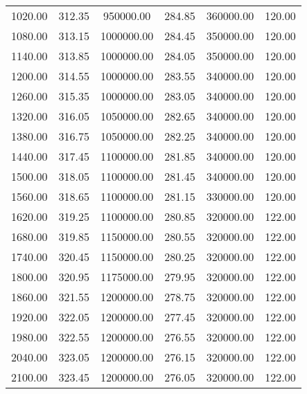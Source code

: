 \begin{table}
\begin{tabular}{S S S S S S}
      1020.00  &      312.35  &   950000.00  &      284.85  &   360000.00  &      120.00\\
      1080.00  &      313.15  &  1000000.00  &      284.45  &   350000.00  &      120.00\\
      1140.00  &      313.85  &  1000000.00  &      284.05  &   350000.00  &      120.00\\
      1200.00  &      314.55  &  1000000.00  &      283.55  &   340000.00  &      120.00\\
      1260.00  &      315.35  &  1000000.00  &      283.05  &   340000.00  &      120.00\\
      1320.00  &      316.05  &  1050000.00  &      282.65  &   340000.00  &      120.00\\
      1380.00  &      316.75  &  1050000.00  &      282.25  &   340000.00  &      120.00\\
      1440.00  &      317.45  &  1100000.00  &      281.85  &   340000.00  &      120.00\\
      1500.00  &      318.05  &  1100000.00  &      281.45  &   340000.00  &      120.00\\
      1560.00  &      318.65  &  1100000.00  &      281.15  &   330000.00  &      120.00\\
      1620.00  &      319.25  &  1100000.00  &      280.85  &   320000.00  &      122.00\\
      1680.00  &      319.85  &  1150000.00  &      280.55  &   320000.00  &      122.00\\
      1740.00  &      320.45  &  1150000.00  &      280.25  &   320000.00  &      122.00\\
      1800.00  &      320.95  &  1175000.00  &      279.95  &   320000.00  &      122.00\\
      1860.00  &      321.55  &  1200000.00  &      278.75  &   320000.00  &      122.00\\
      1920.00  &      322.05  &  1200000.00  &      277.45  &   320000.00  &      122.00\\
      1980.00  &      322.55  &  1200000.00  &      276.55  &   320000.00  &      122.00\\
      2040.00  &      323.05  &  1200000.00  &      276.15  &   320000.00  &      122.00\\
      2100.00  &      323.45  &  1200000.00  &      276.05  &   320000.00  &      122.00\\   
        \bottomrule
    \end{tabular}
\end{table}